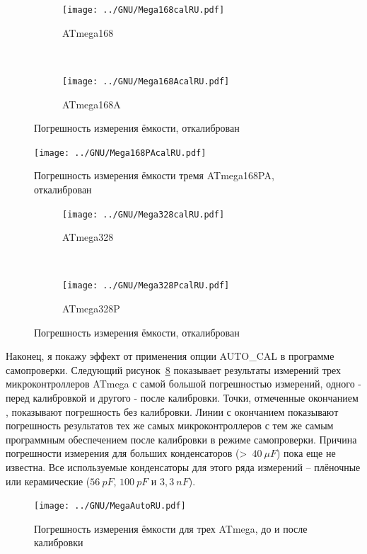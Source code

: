 \begin{figure}[H]
  \begin{subfigure}[b]{.5\textwidth}
    \centering
    \texttt{[image: ../GNU/Mega168calRU.pdf]}
    \caption{ATmega168}
    \label{fig:mega168cal}
  \end{subfigure}
  ~
  \begin{subfigure}[b]{.5\textwidth}
    \centering
    \texttt{[image: ../GNU/Mega168AcalRU.pdf]}
    \caption{ATmega168A}
    \label{fig:mega168Acal}
  \end{subfigure}
  \caption{Погрешность измерения ёмкости, откалиброван}
\end{figure}

\begin{figure}[H]
\centering
\texttt{[image: ../GNU/Mega168PAcalRU.pdf]}
\caption{Погрешность измерения ёмкости тремя ATmega168PA, откалиброван}
\label{fig:mega168PAcal}
\end{figure}

\begin{figure}[H]
  \begin{subfigure}[b]{.5\textwidth}
    \centering
    \texttt{[image: ../GNU/Mega328calRU.pdf]}
    \caption{ATmega328}
    \label{fig:mega328cal}
  \end{subfigure}
  ~
  \begin{subfigure}[b]{.5\textwidth}
    \centering
    \texttt{[image: ../GNU/Mega328PcalRU.pdf]}
    \caption{ATmega328P}
    \label{fig:mega328Pcal}
  \end{subfigure}
  \caption{Погрешность измерения ёмкости, откалиброван}
\end{figure}

Наконец, я покажу эффект от применения опции AUTO\_CAL в программе самопроверки. Следующий рисунок~\ref{fig:MegaAuto} 
показывает результаты измерений трех микроконтроллеров ATmega с самой большой погрешностью измерений, одного - перед 
калибровкой и другого - после калибровки. Точки, отмеченные окончанием , показывают погрешность без калибровки. 
Линии с окончанием  показывают погрешность результатов тех же самых микроконтроллеров с тем же самым программным 
обеспечением после калибровки в режиме самопроверки. Причина погрешности измерения для больших 
конденсаторов (\textgreater~\(40~\mu F\)) пока еще не известна. Все используемые конденсаторы для этого ряда 
измерений – плёночные или керамические  (\(56~pF\), \(100~pF\) и \(3,3~nF\)).

\begin{figure}[H]
\centering
\texttt{[image: ../GNU/MegaAutoRU.pdf]}
\caption{Погрешность измерения ёмкости для трех ATmega, до и после калибровки}
\label{fig:MegaAuto}
\end{figure}

